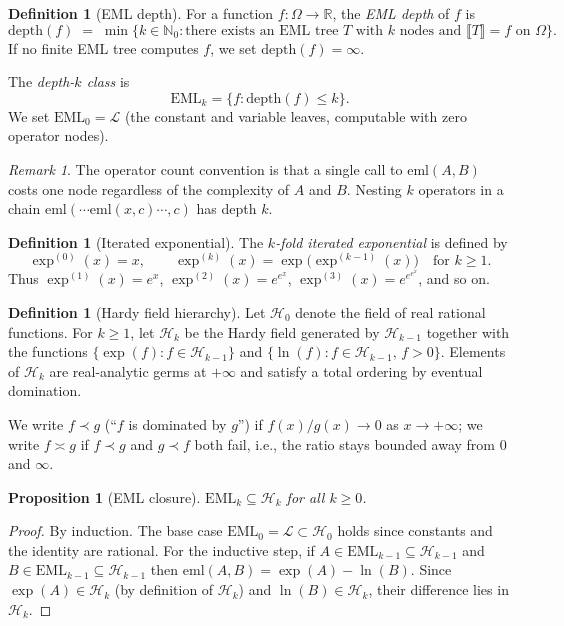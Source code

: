 \documentclass[12pt,a4paper]{article}
\newtheorem{proposition}[theorem]{Proposition}
\theoremstyle{definition}
\newtheorem{definition}[theorem]{Definition}
\theoremstyle{remark}
\newtheorem{remark}[theorem]{Remark}
\begin{document}
\begin{definition}[EML depth]\label{def:depth}
For a function $f\colon\Omega\to\mathbb{R}$, the \emph{EML depth} of $f$ is
\[
  \mathrm{depth}(f)
  \;=\; \min\bigl\{k\in\mathbb{N}_0 : \text{there exists an EML tree $T$ with
        $k$ nodes and $\llbracket T\rrbracket = f$ on $\Omega$}\bigr\}.
\]
If no finite EML tree computes $f$, we set $\mathrm{depth}(f)=\infty$.

The \emph{depth-$k$ class} is
\[
  \mathrm{EML}_k = \{f : \mathrm{depth}(f)\leq k\}.
\]
We set $\mathrm{EML}_0 = \mathcal{L}$ (the constant and variable leaves,
computable with zero operator nodes).
\end{definition}

\begin{remark}
The operator count convention is that a single call to $\mathrm{eml}(A,B)$
costs one node regardless of the complexity of $A$ and $B$.  Nesting $k$
operators in a chain $\mathrm{eml}(\cdots\mathrm{eml}(x,c)\cdots,c)$ has
depth $k$.
\end{remark}

\begin{definition}[Iterated exponential]\label{def:iterexp}
The \emph{$k$-fold iterated exponential} is defined by
\[
  \exp^{(0)}(x) = x, \qquad
  \exp^{(k)}(x) = \exp\!\bigl(\exp^{(k-1)}(x)\bigr)\quad\text{for }k\geq 1.
\]
Thus $\exp^{(1)}(x)=e^x$, $\exp^{(2)}(x)=e^{e^x}$, $\exp^{(3)}(x)=e^{e^{e^x}}$,
and so on.
\end{definition}

\begin{definition}[Hardy field hierarchy]\label{def:hardy}
Let $\mathcal{H}_0$ denote the field of real rational functions.  For $k\geq 1$,
let $\mathcal{H}_k$ be the Hardy field generated by $\mathcal{H}_{k-1}$ together
with the functions $\{\exp(f) : f\in\mathcal{H}_{k-1}\}$ and
$\{\ln(f) : f\in\mathcal{H}_{k-1},\, f>0\}$.
Elements of $\mathcal{H}_k$ are real-analytic germs at $+\infty$ and satisfy a
total ordering by eventual domination.

We write $f\prec g$ (``$f$ is dominated by $g$'') if
$f(x)/g(x)\to 0$ as $x\to+\infty$; we write $f\asymp g$ if
$f\prec g$ and $g\prec f$ both fail, i.e., the ratio stays bounded away
from $0$ and $\infty$.
\end{definition}

\begin{proposition}[EML closure]\label{prop:closure}
$\mathrm{EML}_k \subseteq \mathcal{H}_k$ for all $k\geq 0$.
\end{proposition}
\begin{proof}
By induction.  The base case $\mathrm{EML}_0=\mathcal{L}\subset\mathcal{H}_0$
holds since constants and the identity are rational.
For the inductive step, if $A\in\mathrm{EML}_{k-1}\subseteq\mathcal{H}_{k-1}$
and $B\in\mathrm{EML}_{k-1}\subseteq\mathcal{H}_{k-1}$ then
$\mathrm{eml}(A,B)=\exp(A)-\ln(B)$.  Since $\exp(A)\in\mathcal{H}_k$ (by
definition of $\mathcal{H}_k$) and $\ln(B)\in\mathcal{H}_k$, their difference
lies in $\mathcal{H}_k$.
\end{proof}
\end{document}
